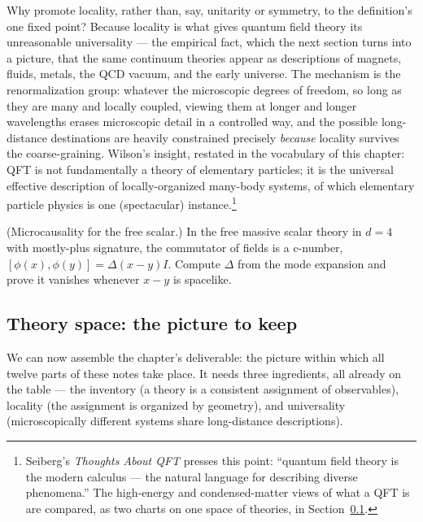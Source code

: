 Why promote locality, rather than, say, unitarity or symmetry, to the
definition's one fixed point? Because locality is what gives quantum field
theory its unreasonable universality --- the empirical fact, which the next
section turns into a picture, that the same continuum theories appear as
descriptions of magnets, fluids, metals, the QCD vacuum, and the early universe.
The mechanism is the renormalization group: whatever the microscopic degrees of
freedom, so long as they are many and locally coupled, viewing them at longer
and longer wavelengths erases microscopic detail in a controlled way, and the
possible long-distance destinations are heavily constrained precisely
\emph{because} locality survives the coarse-graining. Wilson's insight, restated
in the vocabulary of this chapter: QFT is not fundamentally a theory of
elementary particles; it is the universal effective description of
locally-organized many-body systems, of which elementary particle physics is one
(spectacular) instance.\footnote{Seiberg's \emph{Thoughts About QFT} presses
this point: ``quantum field theory is the modern calculus --- the natural
language for describing diverse phenomena.'' The high-energy and
condensed-matter views of what a QFT is are compared, as two charts on one space
of theories, in Section~\ref{sec:theory-space}.}

\begin{exercise}[classic]
\label{exr:microcausality}
(Microcausality for the free scalar.) In the free massive scalar theory in $d=4$
with mostly-plus signature, the commutator of fields is a c-number, $[\phi(x),
\phi(y)] = \Delta(x-y)I$. Compute $\Delta$ from the mode expansion
and prove it vanishes whenever $x - y$ is spacelike.
\end{exercise}

\subsection{Theory space: the picture to keep}
\label{sec:theory-space}

We can now assemble the chapter's deliverable: the picture within which all
twelve parts of these notes take place. It needs three ingredients, all already
on the table --- the inventory (a theory is a consistent assignment of
observables), locality (the assignment is organized by geometry), and
universality (microscopically different systems share long-distance
descriptions).

